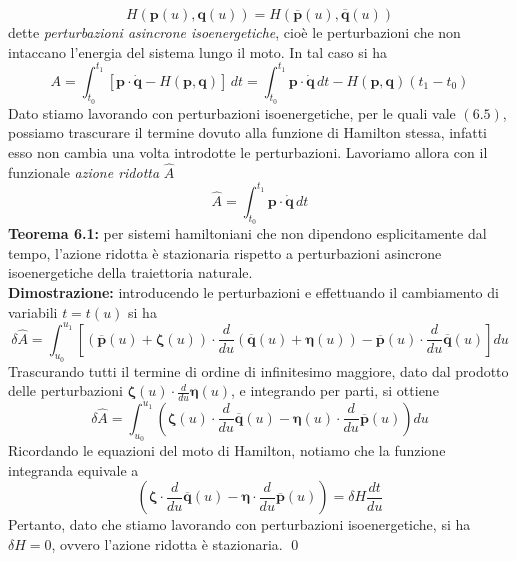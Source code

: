 \documentclass{article}
\begin{document}
\begin{equation}
    H\left(\mathbf{p}(u), \mathbf{q}(u)\right) = H\left( \mathbf{\overline{p}}(u), \mathbf{\overline{q}}(u)\right) \tag{6.5}
\end{equation}
dette \textit{perturbazioni asincrone isoenergetiche}, cioè le perturbazioni che non intaccano l'energia del sistema lungo il moto. In tal caso si ha
\begin{equation}
    A = \int_{t_0}^{t_1} \left[ \mathbf{p} \cdot \mathbf{\dot{q}} - H\left( \mathbf{p}, \mathbf{q} \right) \right] \, dt = \int_{t_0}^{t_1} \mathbf{p} \cdot \mathbf{\dot{q}} \, dt - H(\mathbf{p}, \mathbf{q})(t_1 - t_0) \tag{6.6}
\end{equation}
Dato stiamo lavorando con perturbazioni isoenergetiche, per le quali vale $(6.5)$, possiamo trascurare il termine dovuto alla funzione di Hamilton stessa, infatti esso non cambia una volta introdotte le perturbazioni. Lavoriamo allora con il funzionale \textit{azione ridotta} $\hat{A}$
\begin{equation}
    \hat{A} = \int_{t_0}^{t_1} \mathbf{p} \cdot \mathbf{\dot{q}} \, dt \tag{6.7}
\end{equation}
\textbf{Teorema 6.1:} per sistemi hamiltoniani che non dipendono esplicitamente dal tempo, l'azione ridotta è stazionaria rispetto a perturbazioni asincrone isoenergetiche della traiettoria naturale. \\

\textbf{Dimostrazione:} introducendo le perturbazioni e effettuando il cambiamento di variabili $t = t(u)$ si ha
\begin{equation}
    \delta \hat{A} = \int_{u_0}^{u_1} \left[ \left(\mathbf{\overline{p}}(u) + \boldsymbol{\zeta}(u)\right) \cdot \frac{d}{du} \left( \mathbf{\overline{q}}(u) + \boldsymbol{\eta}(u) \right) - \mathbf{\overline{p}}(u) \cdot \frac{d}{du}\mathbf{\overline{q}}(u) \right] du \tag{6.8}
\end{equation}
Trascurando tutti il termine di ordine di infinitesimo maggiore, dato dal prodotto delle perturbazioni $\boldsymbol{\zeta}(u) \cdot \frac{d}{du}\boldsymbol{\eta}(u)$, e integrando per parti, si ottiene
\begin{equation}
    \delta \hat{A} = \int_{u_0}^{u_1}\left( \boldsymbol{\zeta}(u) \cdot \frac{d}{du}\mathbf{\overline{q}}(u) - \boldsymbol{\eta}(u) \cdot \frac{d}{du}\mathbf{\overline{p}}(u) \right) du \tag{6.9}
\end{equation}
Ricordando le equazioni del moto di Hamilton, notiamo che la funzione integranda equivale a
\begin{equation}
    \left( \boldsymbol{\zeta} \cdot \frac{d}{du}\mathbf{\overline{q}}(u) - \boldsymbol{\eta} \cdot \frac{d}{du}\mathbf{\overline{p}}(u) \right) = \delta H \frac{dt}{du} \tag{6.10}
\end{equation}
Pertanto, dato che stiamo lavorando con perturbazioni isoenergetiche, si ha $\delta H = 0$, ovvero l'azione ridotta è stazionaria. \qed
\end{document}
